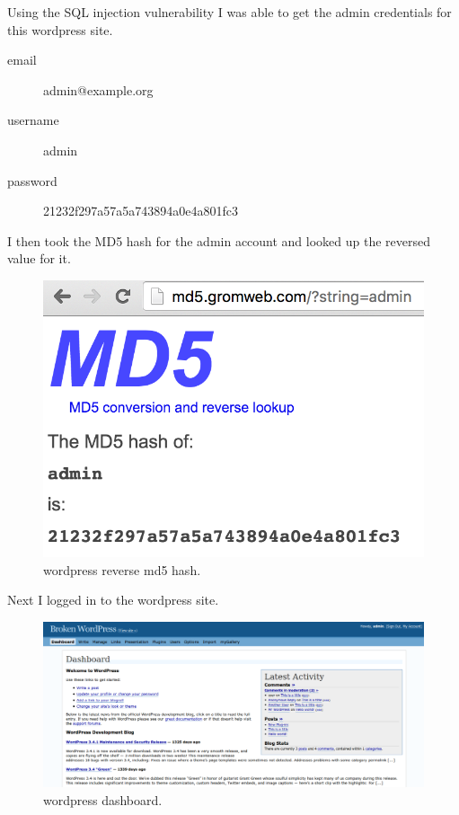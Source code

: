 \documentclass{article}
\begin{document}
Using the SQL injection vulnerability I was able to get the admin credentials for this wordpress site.\ 

\begin{description}
  \item[email] admin@example.org
  \item[username] admin
  \item[password] 21232f297a57a5a743894a0e4a801fc3
\end{description}

\newpage
I then took the MD5 hash for the admin account and looked up the reversed value for it.

\begin{figure}[h!]
	\includegraphics[width=\linewidth]{images/wp-admin-md5.png}
	\caption{wordpress reverse md5 hash.}
	\label{fig:wordpress3}
\end{figure}

\newpage
Next I logged in to the wordpress site.

\begin{figure}[h!]
	\includegraphics[width=\linewidth]{images/wp-logged-in.png}
	\caption{wordpress dashboard.}
	\label{fig:wordpress4}
\end{figure}
\end{document}

